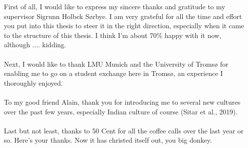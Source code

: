 %
\label{sec:acknowledgement}
First of all, I would like to express my sincere thanks and gratitude to my supervisor Sigrunn Holbek Sørbye. I am very grateful for all the time and effort you put into this thesis to steer it in the right direction, especially when it came to the structure of this thesis. I think I'm about 70\% happy with it now, although .... kidding. \\ \\
Next, I would like to thank LMU Munich and the University of Tromsø for enabling me to go on a student exchange here in Tromsø, an experience I thoroughly enjoyed.
\\ \\
To my good friend Alain, thank you for introducing me to several new cultures over the past few years, especially Indian culture of course (Sitar et al., 2019). 
\\ \\
Last but not least, thanks to 50 Cent for all the coffee calls over the last year or so. Here's your thanks. Now it has christed itself out, you big donkey.